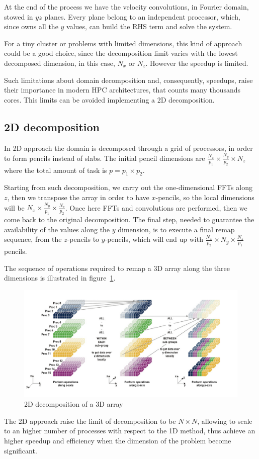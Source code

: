 \par
At the end of the process we have the velocity convolutions, in Fourier domain, stowed in $yz$ planes. Every plane belong to an independent processor, which, since owns all the $y$ values, can build the RHS term and solve the system.\par
For a tiny cluster or problems with limited dimensions, this kind of approach could be a good choice, since the decomposition limit varies with the lowest decomposed dimension, in this case, $N_{x}$ or $N_{z}$. However the speedup is limited. 
\par
Such limitations about domain decomposition and, consequently, speedups, raise their importance in modern HPC architectures, that counts many thousands cores.  
This limits can be avoided implementing a 2D decomposition.





\subsection{2D decomposition}
In 2D approach the domain is decomposed through a grid of processors, in order to form pencils instead of slabs. The initial pencil dimensions are $\frac{N_{x}}{p_{1}}\times \frac{N_{y}}{p_{2}}\times N_{z}$ where the total amount of task is $p = p_{1}\times p_{2}$.
\par

Starting from such decomposition, we carry out the one-dimensional FFTs along $z$, then we transpose the array in order to have $x$-pencils, so the local dimensions will be $N_{x} \times \frac{N_{y}}{p_{1}} \times \frac{N_{z}}{p_{2}}$. Once here FFTs and convolutions are performed, then we come back to the original decomposition. The final step, needed to guarantee the availability of the values along the $y$ dimension, is to execute a final remap sequence, from the $z$-pencils to $y$-pencils, which will end up with $\frac{N_{x}}{p_{2}} \times N_{y} \times \frac{N_{z}}{p_{1}}$ pencils.

The sequence of operations required to remap a 3D array along the three dimensions is illustrated in figure~\ref{2d:decomp}. 
\par
\begin{figure}
\begin{center}
\includegraphics[width=1.08\textwidth]{grafici/2d_decomp}
\caption{2D decomposition of a 3D array}
\label{2d:decomp}
\end{center}
\end{figure}

The 2D approach raise the limit of decomposition to be $N\times N$, allowing to scale to an higher number of processes with respect to the 1D method, thus achieve an higher speedup and efficiency when the dimension of the problem become significant.

